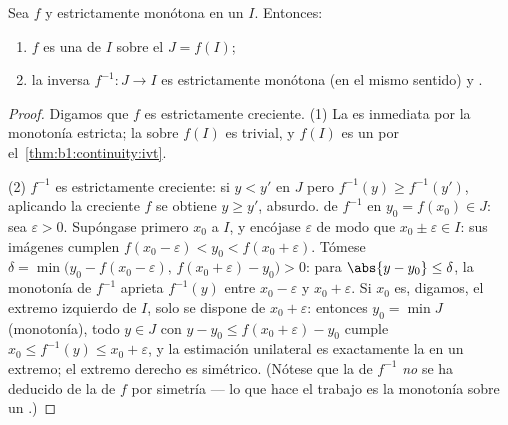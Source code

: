 \begin{theorem}\label{thm:b1:continuity:bijection}
Sea $f$  y estrictamente monótona en un  $I$. Entonces:
\begin{enumerate}
  \item $f$ es una  de $I$ sobre el  $J = f(I)$;
  \item la inversa $f^{-1} \colon J \to I$ es estrictamente monótona
        (en el mismo sentido) y \emph{}.
\end{enumerate}
\end{theorem}

\begin{proof}
Digamos que $f$ es estrictamente creciente. (1) La  es
inmediata por la monotonía estricta; la  sobre $f(I)$
es trivial, y $f(I)$ es un  por el~\cref{thm:b1:continuity:ivt}.

(2) $f^{-1}$ es estrictamente creciente: si $y < y'$ en $J$ pero
$f^{-1}(y) \geq f^{-1}(y')$, aplicando la creciente $f$ se obtiene
$y \geq y'$, absurdo.  de $f^{-1}$ en
$y_0 = f(x_0) \in J$: sea $\varepsilon > 0$. Supóngase primero $x_0$
 a $I$, y encójase $\varepsilon$ de modo que
$x_0 \pm \varepsilon \in I$: sus imágenes cumplen
$f(x_0 - \varepsilon) < y_0 < f(x_0 + \varepsilon)$. Tómese
$\delta = \min\bigl(y_0 - f(x_0 - \varepsilon),\, f(x_0 +
\varepsilon) - y_0\bigr) > 0$: para $\abs{y - y_0} \leq \delta$, la
monotonía de $f^{-1}$ aprieta $f^{-1}(y)$ entre $x_0 - \varepsilon$ y
$x_0 + \varepsilon$. Si $x_0$ es, digamos, el extremo izquierdo de
$I$, solo se dispone de $x_0 + \varepsilon$: entonces
$y_0 = \min J$ (monotonía), todo $y \in J$ con
$y - y_0 \leq f(x_0 + \varepsilon) - y_0$ cumple
$x_0 \leq f^{-1}(y) \leq x_0 + \varepsilon$, y la estimación
unilateral es exactamente la  en un extremo; el extremo
derecho es simétrico. (Nótese que la  de $f^{-1}$
\emph{no} se ha deducido de la de $f$ por simetría --- lo que hace el
trabajo es la monotonía sobre un .)
\end{proof}

